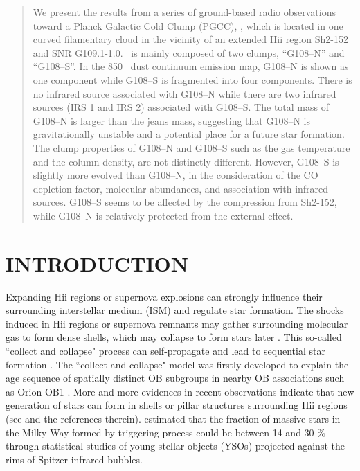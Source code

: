 \documentclass[manuscript]{aastex}
\begin{document}
\begin{abstract}
We present the results from a series of ground-based radio observations toward a Planck Galactic Cold Clump (PGCC), \sou, which is located in one curved filamentary cloud in the vicinity of an extended H{\sc ii} region Sh2-152 and SNR G109.1-1.0.
\sou\ is mainly composed of two clumps, ``G108--N'' and ``G108--S''.
In the 850 \m\ dust continuum emission map, G108--N is shown as one component while G108--S is fragmented into four components.
There is no infrared source associated with G108--N while there are two infrared sources (IRS 1 and IRS 2) associated with G108--S.
The total mass of G108--N is larger than the jeans mass, suggesting that G108--N is gravitationally unstable and a potential place for a future star formation.
The clump properties of G108--N and G108--S such as the gas temperature and the column density, are not distinctly different.
However, G108--S is slightly more evolved than G108--N, in the consideration of the CO depletion factor, molecular abundances, and association with infrared sources.
G108--S seems to be affected by the compression from Sh2-152, while G108--N is relatively protected from the external effect. 
\clearpage
\end{abstract}




\section{INTRODUCTION}

Expanding H{\sc ii} regions or supernova explosions can strongly influence their surrounding interstellar medium (ISM) and regulate star formation. The shocks induced
in H{\sc ii} regions or supernova remnants may gather surrounding molecular gas to form dense shells, which may collapse to form stars later \citep{el77,whit94}.
This so-called ``collect and collapse" process can self-propagate and lead to sequential star formation \citep{el77,whit94}. The ``collect and collapse" model was firstly developed to explain the age sequence of spatially
distinct OB subgroups in nearby OB associations such as Orion OB1 \citep{el77}. More and more evidences in recent observations indicate that new generation of stars can form in shells or pillar structures surrounding H{\sc ii} regions (see \citealt{liu12a,dale15,liu15,liu16a} and the references therein). \cite{thom12} estimated that the fraction of massive
stars in the Milky Way formed by triggering process could be between 14 and 30 $\%$ through statistical studies of young stellar objects (YSOs) projected against the rims of Spitzer infrared bubbles.
\end{document}
